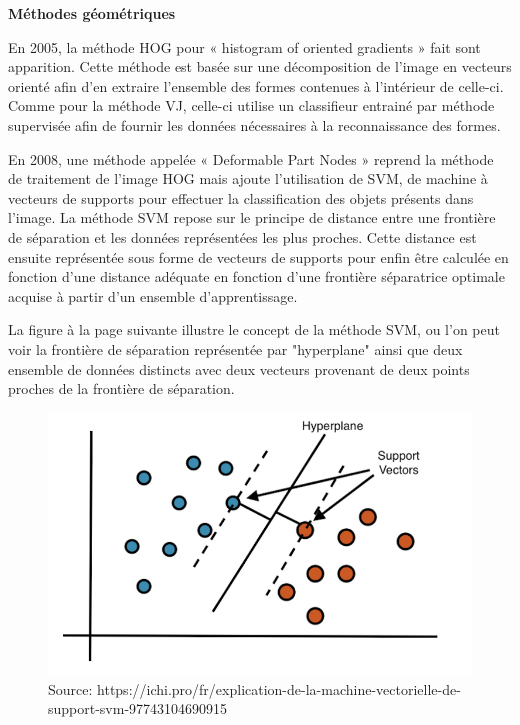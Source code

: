 \documentclass[a4paper,12pt]{article} %
\begin{document}
\textbf{Méthodes géométriques }\newline
\par
En 2005, la méthode HOG pour « histogram of oriented gradients » fait sont apparition. Cette méthode est basée sur une décomposition de l’image en vecteurs orienté afin d’en extraire l’ensemble des formes contenues à l’intérieur de celle-ci. Comme pour la méthode VJ, celle-ci utilise un classifieur entrainé par méthode supervisée afin de fournir les données nécessaires à la reconnaissance des formes. \newline
\par
En 2008, une méthode appelée « Deformable Part Nodes » reprend la méthode de traitement de l’image HOG mais ajoute l’utilisation de SVM, de machine à vecteurs de supports pour effectuer la classification des objets présents dans l’image. La méthode SVM repose sur le principe de distance entre une frontière de séparation et les données représentées les plus proches. Cette distance est ensuite représentée sous forme de vecteurs de supports pour enfin être calculée en fonction d’une distance adéquate en fonction d’une frontière séparatrice optimale acquise à partir d’un ensemble d’apprentissage.
\newline
\par
La figure à la page suivante illustre le concept de la méthode SVM, ou l'on peut voir la frontière de séparation représentée par "hyperplane" ainsi que deux ensemble de données distincts avec deux vecteurs provenant de deux points proches de la frontière de séparation. 
\begin{figure}[h] %
  \centering %
  \includegraphics[scale=0.40]{vectors.png} %
  \caption{Source: https://ichi.pro/fr/explication-de-la-machine-vectorielle-de-support-svm-97743104690915} %
\end{figure}
\newline
\end{document}
